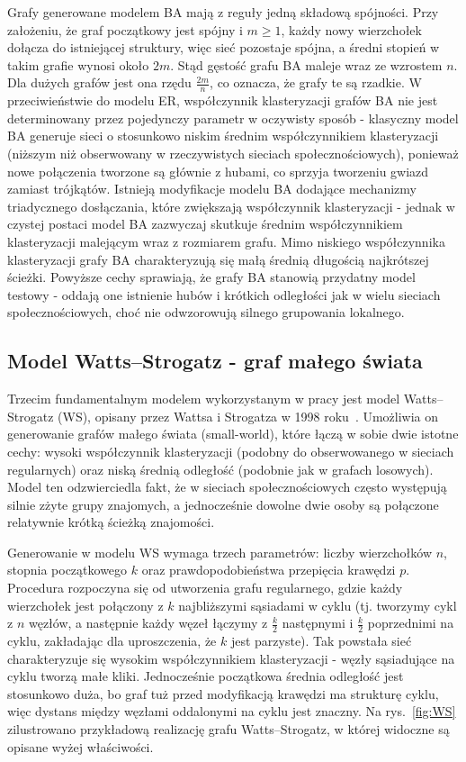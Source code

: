 Grafy generowane modelem BA mają z reguły jedną składową spójności. Przy założeniu, że graf początkowy jest spójny i $m \ge 1$, każdy nowy wierzchołek dołącza do istniejącej struktury, więc sieć pozostaje spójna, a średni stopień w takim grafie wynosi około $2m$. Stąd gęstość grafu BA maleje wraz ze wzrostem $n$. Dla dużych grafów jest ona rzędu $\frac{2m}{n}$, co oznacza, że grafy te są rzadkie. W przeciwieństwie do modelu ER, współczynnik klasteryzacji grafów BA nie jest determinowany przez pojedynczy parametr w oczywisty sposób - klasyczny model BA generuje sieci o stosunkowo niskim średnim współczynnikiem klasteryzacji (niższym niż obserwowany w rzeczywistych sieciach społecznościowych), ponieważ nowe połączenia tworzone są głównie z hubami, co sprzyja tworzeniu gwiazd zamiast trójkątów. Istnieją modyfikacje modelu BA dodające mechanizmy triadycznego dosłączania, które zwiększają współczynnik klasteryzacji - jednak w czystej postaci model BA zazwyczaj skutkuje średnim współczynnikiem klasteryzacji malejącym wraz z rozmiarem grafu. Mimo niskiego współczynnika klasteryzacji grafy BA charakteryzują się małą średnią długością najkrótszej ścieżki. Powyższe cechy sprawiają, że grafy BA stanowią przydatny model testowy - oddają one istnienie hubów i krótkich odległości jak w wielu sieciach społecznościowych, choć nie odwzorowują silnego grupowania lokalnego.

\subsection{Model Watts--Strogatz - graf małego świata}
Trzecim fundamentalnym modelem wykorzystanym w pracy jest model Watts--Strogatz (WS), opisany przez Wattsa i Strogatza w 1998 roku~\cite{Watts1998}. Umożliwia on generowanie grafów małego świata (small-world), które łączą w sobie dwie istotne cechy: wysoki współczynnik klasteryzacji (podobny do obserwowanego w sieciach regularnych) oraz niską średnią odległość (podobnie jak w grafach losowych). Model ten odzwierciedla fakt, że w sieciach społecznościowych często występują silnie zżyte grupy znajomych, a jednocześnie dowolne dwie osoby są połączone relatywnie krótką ścieżką znajomości.

Generowanie w modelu WS wymaga trzech parametrów: liczby wierzchołków $n$, stopnia początkowego $k$ oraz prawdopodobieństwa przepięcia krawędzi $p$. Procedura rozpoczyna się od utworzenia grafu regularnego, gdzie każdy wierzchołek jest połączony z $k$ najbliższymi sąsiadami w cyklu (tj. tworzymy cykl z $n$ węzłów, a następnie każdy węzeł łączymy z $\frac{k}{2}$ następnymi i $\frac{k}{2}$ poprzednimi na cyklu, zakładając dla uproszczenia, że $k$ jest parzyste). Tak powstała sieć charakteryzuje się wysokim współczynnikiem klasteryzacji - węzły sąsiadujące na cyklu tworzą małe kliki.
Jednocześnie początkowa średnia odległość jest stosunkowo duża, bo graf tuż przed modyfikacją krawędzi ma strukturę cyklu, więc dystans między węzłami oddalonymi na cyklu jest znaczny. Na rys.~\ref{fig:WS} zilustrowano przykładową realizację grafu Watts--Strogatz, w której widoczne są opisane wyżej właściwości.

